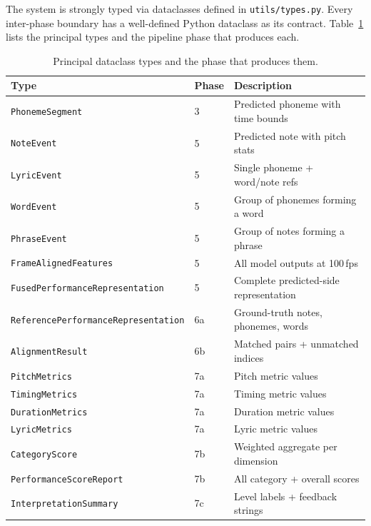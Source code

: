 \documentclass[11pt,letterpaper]{article}
\begin{document}
The system is strongly typed via dataclasses defined in \texttt{utils/types.py}.
Every inter-phase boundary has a well-defined Python dataclass as its contract.
Table~\ref{tab:types} lists the principal types and the pipeline phase that
produces each.

\begin{table}[h]
  \centering
  \caption{Principal dataclass types and the phase that produces them.}
  \label{tab:types}
  \renewcommand{\arraystretch}{1.2}
  \begin{tabular}{@{}lll@{}}
    \toprule
    Type & Phase & Description \\
    \midrule
    \texttt{PhonemeSegment}                  & 3 & Predicted phoneme with time bounds \\
    \texttt{NoteEvent}                       & 5 & Predicted note with pitch stats \\
    \texttt{LyricEvent}                      & 5 & Single phoneme + word/note refs \\
    \texttt{WordEvent}                       & 5 & Group of phonemes forming a word \\
    \texttt{PhraseEvent}                     & 5 & Group of notes forming a phrase \\
    \texttt{FrameAlignedFeatures}            & 5 & All model outputs at 100\,fps \\
    \texttt{FusedPerformanceRepresentation}  & 5 & Complete predicted-side representation \\
    \texttt{ReferencePerformanceRepresentation} & 6a & Ground-truth notes, phonemes, words \\
    \texttt{AlignmentResult}                 & 6b & Matched pairs + unmatched indices \\
    \texttt{PitchMetrics}                    & 7a & Pitch metric values \\
    \texttt{TimingMetrics}                   & 7a & Timing metric values \\
    \texttt{DurationMetrics}                 & 7a & Duration metric values \\
    \texttt{LyricMetrics}                    & 7a & Lyric metric values \\
    \texttt{CategoryScore}                   & 7b & Weighted aggregate per dimension \\
    \texttt{PerformanceScoreReport}          & 7b & All category + overall scores \\
    \texttt{InterpretationSummary}           & 7c & Level labels + feedback strings \\
    \bottomrule
  \end{tabular}
\end{table}
\end{document}
